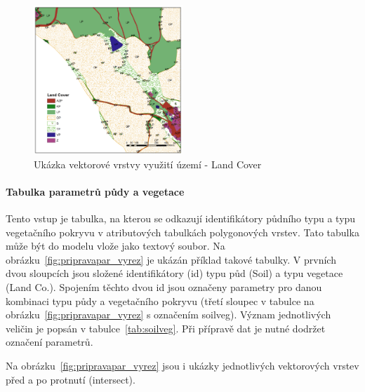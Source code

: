 \begin{figure}
  \centering
  \includegraphics[width=0.5\textwidth]{./img/LandCover.png}
  \caption{Ukázka vektorové vrstvy využití území -  Land Cover}
  \label{fig:bykovicevegetace}
\end{figure}



\paragraph{Tabulka parametrů půdy a vegetace}  \label{sec:upravatabulkyparametru}

Tento vstup je tabulka, na kterou se odkazují identifikátory půdního typu a typu vegetačního pokryvu v atributových tabulkách polygonových vrstev. Tato tabulka může být do modelu vlože jako textový soubor. Na obrázku~\ref{fig:pripravapar_vyrez} je ukázán příklad takové tabulky. V prvních dvou sloupcích jsou složené identifikátory (id) typu půd (Soil) a typu vegetace (Land Co.). Spojením těchto dvou id jsou označeny parametry pro danou kombinaci typu půdy a vegetačního pokryvu (třetí sloupec v tabulce na obrázku~\ref{fig:pripravapar_vyrez} s označením soilveg). Význam jednotlivých veličin je popsán v tabulce~\ref{tab:soilveg}. Při přípravě dat je nutné dodržet označení parametrů. 

Na obrázku~\ref{fig:pripravapar_vyrez} jsou i ukázky jednotlivých vektorových vrstev před a po protnutí (intersect). 

